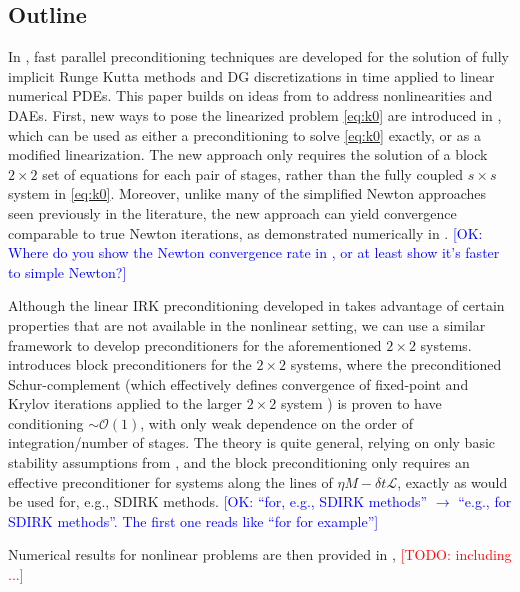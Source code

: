\documentclass[review]{siamart}
\makeatletter
\newcommand{\todo}[1]{\textcolor{red}{[TODO\@: #1]}}
\newcommand{\OK}[1]{\textcolor{blue}{[OK: #1]}}
\makeatother
\begin{document}
\subsection{Outline}\label{sec:intro:outline}

In \cite{irk1}, fast parallel preconditioning techniques are developed for
the solution of fully implicit Runge Kutta methods and DG discretizations
in time applied to linear numerical PDEs. This paper builds on ideas from
\cite{irk1} to address nonlinearities and DAEs. First, new ways to pose the
linearized problem \eqref{eq:k0} are introduced in ,
which can be used as either a preconditioning to solve \eqref{eq:k0} exactly,
or as a modified linearization. The new approach only requires the solution
of a block $2\times 2$ set of equations for each pair of stages, rather than
the fully coupled $s\times s$ system in \eqref{eq:k0}. Moreover, unlike many
of the simplified Newton approaches seen previously in the literature, the
new approach can yield convergence comparable to true Newton iterations, as
demonstrated numerically in .
%
\OK{Where do you show the Newton convergence rate in \Cref{sec:numerics}, or at least show it's faster to simple Newton?}
%

Although the linear IRK preconditioning developed in \cite{irk1} takes
advantage of certain properties that are not available in the nonlinear
setting, we can use a similar framework to develop preconditioners for the
aforementioned $2\times 2$ systems.  introduces block
preconditioners for the $2\times 2$ systems, where the preconditioned
Schur-complement (which effectively defines convergence of fixed-point
and Krylov iterations applied to the larger $2\times 2$ system
\cite{2x2block}) is proven to have conditioning $\sim\mathcal{O}(1)$,
with only weak dependence on the order of integration/number of stages.
The theory is quite general, relying on only basic stability assumptions
from , and the block preconditioning only requires
an effective preconditioner for systems along the lines of
$\eta M - \delta t\mathcal{L}$, exactly as would be used for, e.g.,
SDIRK methods.
%
\OK{``for, e.g., SDIRK methods'' $\to$ ``e.g., for SDIRK methods''. The first one reads like ``for for example''}
%

Numerical results for nonlinear problems are then provided in
, \todo{including ...}
\end{document}
